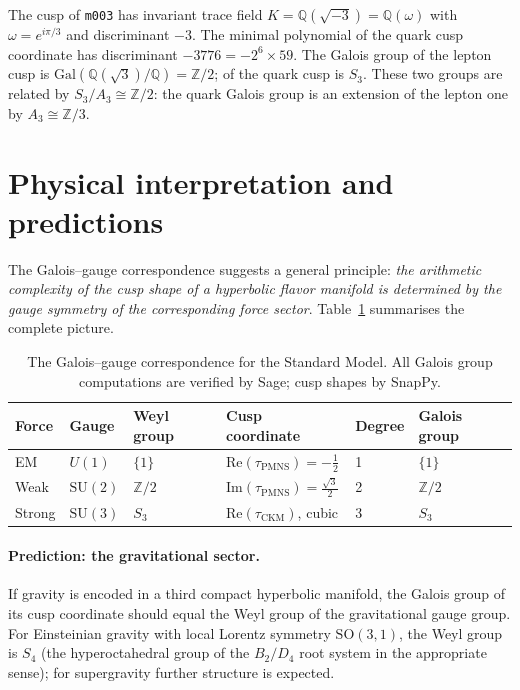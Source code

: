 \documentclass[11pt,a4paper]{article}
\theoremstyle{definition}
\theoremstyle{remark}
\newcommand{\mfld}[1]{\texttt{#1}}
\begin{document}
The cusp of \mfld{m003} has invariant trace field $K=\mathbb{Q}(\sqrt{-3})
=\mathbb{Q}(\omega)$ with $\omega=e^{i\pi/3}$ and discriminant $-3$.
The minimal polynomial of the quark cusp coordinate has discriminant
$-3776=-2^6\times59$.
The Galois group of the lepton cusp is $\mathrm{Gal}(\mathbb{Q}(\sqrt3)
/\mathbb{Q})=\mathbb{Z}/2$; of the quark cusp is $S_3$.
These two groups are related by $S_3/A_3\cong\mathbb{Z}/2$: the quark
Galois group is an extension of the lepton one by $A_3\cong\mathbb{Z}/3$.

\section{Physical interpretation and predictions}
\label{sec:physics}

The Galois--gauge correspondence suggests a general principle:
\emph{the arithmetic complexity of the cusp shape of a hyperbolic
flavor manifold is determined by the gauge symmetry of the
corresponding force sector}.
Table~\ref{tab:main} summarises the complete picture.

\begin{table}[htbp]
\centering
\caption{The Galois--gauge correspondence for the Standard Model.
All Galois group computations are verified by Sage; cusp shapes by SnapPy.}
\label{tab:main}
\begin{tabular}{llllll}
\toprule
Force & Gauge & Weyl group & Cusp coordinate & Degree & Galois group \\
\midrule
EM    & $U(1)$          & $\{1\}$       &
  $\mathrm{Re}(\tau_{\mathrm{PMNS}})=-\tfrac12$ & 1 & $\{1\}$ \\
Weak  & $\mathrm{SU}(2)$ & $\mathbb{Z}/2$ &
  $\mathrm{Im}(\tau_{\mathrm{PMNS}})=\tfrac{\sqrt3}{2}$ & 2 & $\mathbb{Z}/2$ \\
Strong & $\mathrm{SU}(3)$ & $S_3$        &
  $\mathrm{Re}(\tau_{\mathrm{CKM}})$, cubic & 3 & $S_3$ \\
\bottomrule
\end{tabular}
\end{table}

\paragraph{Prediction: the gravitational sector.}
If gravity is encoded in a third compact hyperbolic manifold, the
Galois group of its cusp coordinate should equal the Weyl group of
the gravitational gauge group.
For Einsteinian gravity with local Lorentz symmetry $\mathrm{SO}(3,1)$,
the Weyl group is $S_4$ (the hyperoctahedral group of the $B_2/D_4$
root system in the appropriate sense); for supergravity further
structure is expected.
\end{document}
